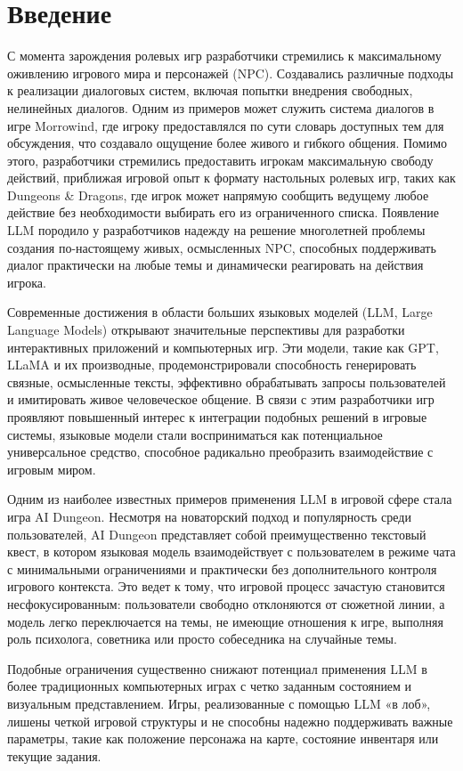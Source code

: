 \documentclass[14pt]{extarticle}
\begin{document}
\section{Введение}
С момента зарождения ролевых игр разработчики стремились к максимальному оживлению игрового мира и персонажей (NPC). Создавались различные подходы к реализации диалоговых систем, включая попытки внедрения свободных, нелинейных диалогов. Одним из примеров может служить система диалогов в игре Morrowind, где игроку предоставлялся по сути словарь доступных тем для обсуждения, что создавало ощущение более живого и гибкого общения. Помимо этого, разработчики стремились предоставить игрокам максимальную свободу действий, приближая игровой опыт к формату настольных ролевых игр, таких как Dungeons \& Dragons, где игрок может напрямую сообщить ведущему любое действие без необходимости выбирать его из ограниченного списка. Появление LLM породило у разработчиков надежду на решение многолетней проблемы создания по-настоящему живых, осмысленных NPC, способных поддерживать диалог практически на любые темы и динамически реагировать на действия игрока.

Современные достижения в области больших языковых моделей (LLM, Large Language Models) открывают значительные перспективы для разработки интерактивных приложений и компьютерных игр. Эти модели, такие как GPT, LLaMA и их производные, продемонстрировали способность генерировать связные, осмысленные тексты, эффективно обрабатывать запросы пользователей и имитировать живое человеческое общение. В связи с этим разработчики игр проявляют повышенный интерес к интеграции подобных решений в игровые системы, языковые модели стали восприниматься как потенциальное универсальное средство, способное радикально преобразить взаимодействие с игровым миром.

Одним из наиболее известных примеров применения LLM в игровой сфере стала игра AI Dungeon. Несмотря на новаторский подход и популярность среди пользователей, AI Dungeon представляет собой преимущественно текстовый квест, в котором языковая модель взаимодействует с пользователем в режиме чата с минимальными ограничениями и практически без дополнительного контроля игрового контекста. Это ведет к тому, что игровой процесс зачастую становится несфокусированным: пользователи свободно отклоняются от сюжетной линии, а модель легко переключается на темы, не имеющие отношения к игре, выполняя роль психолога, советника или просто собеседника на случайные темы.

Подобные ограничения существенно снижают потенциал применения LLM в более традиционных компьютерных играх с четко заданным состоянием и визуальным представлением. Игры, реализованные с помощью LLM «в лоб», лишены четкой игровой структуры и не способны надежно поддерживать важные параметры, такие как положение персонажа на карте, состояние инвентаря или текущие задания.
\end{document}
